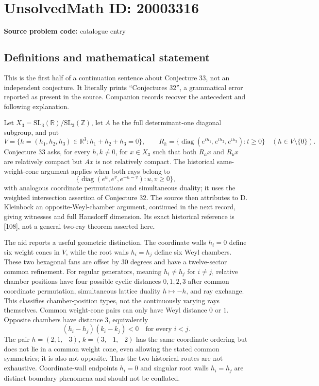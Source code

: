 \documentclass[11pt]{article}
\newcommand{\Z}{\mathbb{Z}}
\newcommand{\R}{\mathbb{R}}
\begin{document}
\section*{UnsolvedMath ID: 20003316}
\textbf{Source problem code:} catalogue entry
\subsection{Definitions and mathematical statement}
This is the first half of a continuation sentence about Conjecture 33, not an independent conjecture. It literally prints ``Conjectures 32'', a grammatical error reported as present in the source. Companion records recover the antecedent and following explanation.

Let $X_3=\mathrm{SL}_3(\R)/\mathrm{SL}_3(\Z)$, let $A$ be the full determinant-one diagonal subgroup, and put
\[
 V=\{h=(h_1,h_2,h_3)\in\R^3:h_1+h_2+h_3=0\},\qquad
 R_h=\{\operatorname{diag}(e^{th_1},e^{th_2},e^{th_3}):t\ge0\}
 \quad(h\in V\setminus\{0\}).
\]
Conjecture 33 asks, for every $h,k\ne0$, for $x\in X_3$ such that both $R_hx$ and $R_kx$ are relatively compact but $Ax$ is not relatively compact. The historical same-weight-cone argument applies when both rays belong to
\[
 \{\operatorname{diag}(e^u,e^v,e^{-u-v}):u,v\ge0\},
\]
with analogous coordinate permutations and simultaneous duality; it uses the weighted intersection assertion of Conjecture 32. The source then attributes to D. Kleinbock an opposite-Weyl-chamber argument, continued in the next record, giving witnesses and full Hausdorff dimension. Its exact historical reference is [108], not a general two-ray theorem asserted here.

The aid reports a useful geometric distinction. The coordinate walls $h_i=0$ define six weight cones in $V$, while the root walls $h_i=h_j$ define six Weyl chambers. These two hexagonal fans are offset by $30$ degrees and have a twelve-sector common refinement. For regular generators, meaning $h_i\ne h_j$ for $i\ne j$, relative chamber positions have four possible cyclic distances $0,1,2,3$ after common coordinate permutation, simultaneous lattice duality $h\mapsto-h$, and ray exchange. This classifies chamber-position types, not the continuously varying rays themselves. Common weight-cone pairs can only have Weyl distance $0$ or $1$. Opposite chambers have distance $3$, equivalently
\[
 (h_i-h_j)(k_i-k_j)<0\quad\text{for every }i<j.
\]
The pair $h=(2,1,-3)$, $k=(3,-1,-2)$ has the same coordinate ordering but does not lie in a common weight cone, even allowing the stated common symmetries; it is also not opposite. Thus the two historical routes are not exhaustive. Coordinate-wall endpoints $h_i=0$ and singular root walls $h_i=h_j$ are distinct boundary phenomena and should not be conflated.
\end{document}
